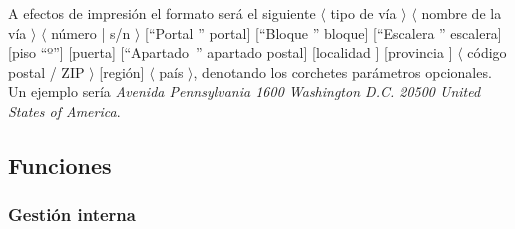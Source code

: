 \documentclass[11pt, a4paper, twoside]{report}
\begin{document}
				A efectos de impresión el formato será el siguiente {\texttt {} $\langle$ tipo de vía $\rangle$ $\langle$ nombre de la vía $\rangle$ $\langle$ número | s/n $\rangle$ [``Portal ''  portal] [``Bloque ''  bloque] [``Escalera ''  escalera] [piso ``º''] [puerta] [``Apartado~'' apartado postal] [localidad ] [provincia ] $\langle$ código postal / ZIP $\rangle$ [región] $\langle$ país $\rangle$}, denotando los corchetes parámetros opcionales.\\
	
				Un ejemplo sería {\itshape Avenida Pennsylvania 1600 Washington D.C. 20500 United States of America}.
		
		\startcontents[tocfunciones]

		\subsection{Funciones}
			\subsubsection{Gestión interna}
				

				

				
			
				

				

				

				

				

				

				

				
				
				
\end{document}

